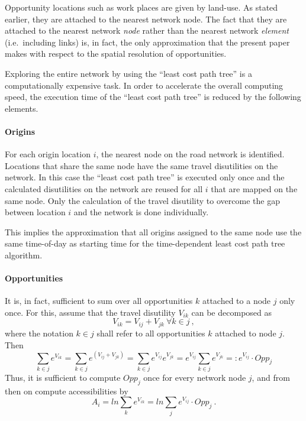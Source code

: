 Opportunity locations such as work places are given by land-use. As stated earlier, they are attached to the nearest network node. 
%
The fact that they are attached to the nearest network \emph{node} rather than the nearest network \emph{element} (i.e.\ including links) is, in fact, the only approximation that the present paper makes with respect to the spatial resolution of opportunities.  

Exploring the entire network by using the ``least cost path tree'' is
a computationally expensive task. In order to accelerate the overall
computing speed, the execution time of the ``least cost path tree'' is
reduced by the following elements.

\paragraph{Origins} 

For each origin location $i$, the nearest node on the road network is
identified. Locations that share the same node have the same travel
disutilities on the network.  In this case the ``least cost path
tree'' is executed only once and the calculated disutilities on the
network are reused for all $i$ that are mapped on the same node. Only
the calculation of the travel disutility to overcome the gap between
location $i$ and the network is done individually.

This implies the approximation that all origins assigned to the same node use the same time-of-day as starting time for the time-dependent least cost path tree algorithm.

\paragraph{Opportunities}

It is, in fact, sufficient to sum over all opportunities $k$ attached to a node
$j$ only once.  For this, assume that the travel disutility $V_{ik}$ can be
decomposed as
\begin{equation}
V_{ik} = V_{ij} + V_{jk} \ \forall k \in j \ ,
\end{equation}
where the notation $k \in j$ shall refer to all opportunities $k$ attached to node $j$.
Then 
\begin{equation}
\sum_{k \in j} e^{ V_{ik}} 
%
= \sum_{k \in j} e^{ (V_{ij}+ V_{jk})} 
%
= \sum_{k \in j} e^{ V_{ij}} e^{ V_{jk}} 
%
= e^{ V_{ij}} \sum_{k \in j} e^{ V_{jk}} 
%
=: e^{ V_{ij}} \cdot Opp_j
\end{equation} 
Thus, it is sufficient to compute $Opp_j$ once for every network node $j$, and from then on compute accessibilities by
\begin{equation}
A_i = ln \sum_k e^{ V_{ik}}
%
= ln \sum_j e^{ V_{ij}} \cdot Opp_j \ .
\end{equation}

